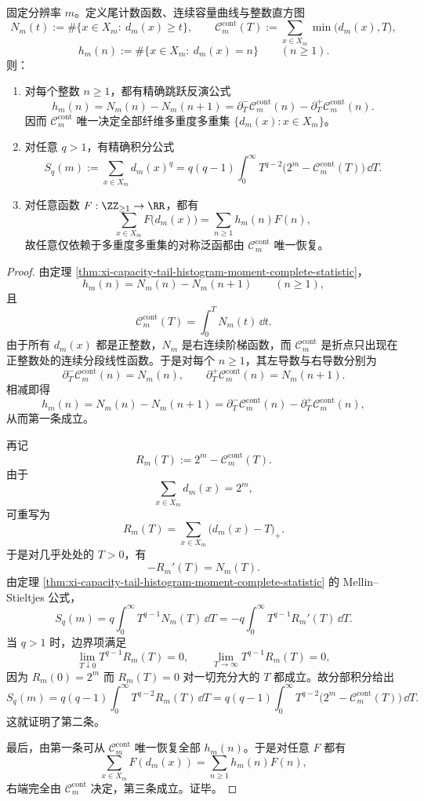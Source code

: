\begin{theorem}[连续容量曲线对纤维多重度谱的完全可逆性]\label{thm:xi-time-part62df-capacity-curve-complete-inversion}
固定分辨率 \(m\)。定义尾计数函数、连续容量曲线与整数直方图
\[
N_m(t):=\#\{x\in X_m:\ d_m(x)\ge t\},
\qquad
\mathcal C_m^{\mathrm{cont}}(T):=\sum_{x\in X_m}\min\bigl(d_m(x),T\bigr),
\]
\[
h_m(n):=\#\{x\in X_m:\ d_m(x)=n\}
\qquad (n\ge 1).
\]
则：
\begin{enumerate}
  \item 对每个整数 \(n\ge 1\)，都有精确跳跃反演公式
  \[
  h_m(n)=N_m(n)-N_m(n+1)
  =\partial_T^{-}\mathcal C_m^{\mathrm{cont}}(n)-\partial_T^{+}\mathcal C_m^{\mathrm{cont}}(n).
  \]
  因而 \(\mathcal C_m^{\mathrm{cont}}\) 唯一决定全部纤维多重度多重集 \(\{d_m(x):x\in X_m\}\)。
  \item 对任意 \(q>1\)，有精确积分公式
  \[
  S_q(m):=\sum_{x\in X_m}d_m(x)^q
  =
  q(q-1)\int_0^\infty
  T^{q-2}\bigl(2^m-\mathcal C_m^{\mathrm{cont}}(T)\bigr)\,\dd T.
  \]
  \item 对任意函数 \(F:\ZZ_{\ge 1}\to \RR\)，都有
  \[
  \sum_{x\in X_m}F\bigl(d_m(x)\bigr)
  =
  \sum_{n\ge 1}h_m(n)F(n),
  \]
  故任意仅依赖于多重度多重集的对称泛函都由 \(\mathcal C_m^{\mathrm{cont}}\) 唯一恢复。
\end{enumerate}
\end{theorem}
\begin{proof}
由定理 \ref{thm:xi-capacity-tail-histogram-moment-complete-statistic}，
\[
h_m(n)=N_m(n)-N_m(n+1)
\qquad(n\ge 1),
\]
且
\[
\mathcal C_m^{\mathrm{cont}}(T)=\int_0^T N_m(t)\,\dd t.
\]
由于所有 \(d_m(x)\) 都是正整数，\(N_m\) 是右连续阶梯函数，而 \(\mathcal C_m^{\mathrm{cont}}\) 是折点只出现在正整数处的连续分段线性函数。于是对每个 \(n\ge 1\)，其左导数与右导数分别为
\[
\partial_T^{-}\mathcal C_m^{\mathrm{cont}}(n)=N_m(n),
\qquad
\partial_T^{+}\mathcal C_m^{\mathrm{cont}}(n)=N_m(n+1).
\]
相减即得
\[
h_m(n)
=
N_m(n)-N_m(n+1)
=
\partial_T^{-}\mathcal C_m^{\mathrm{cont}}(n)-\partial_T^{+}\mathcal C_m^{\mathrm{cont}}(n),
\]
从而第一条成立。

再记
\[
R_m(T):=2^m-\mathcal C_m^{\mathrm{cont}}(T).
\]
由于
\[
\sum_{x\in X_m}d_m(x)=2^m,
\]
可重写为
\[
R_m(T)=\sum_{x\in X_m}\bigl(d_m(x)-T\bigr)_+.
\]
于是对几乎处处的 \(T>0\)，有
\[
-R_m'(T)=N_m(T).
\]
由定理 \ref{thm:xi-capacity-tail-histogram-moment-complete-statistic} 的 Mellin--Stieltjes 公式，
\[
S_q(m)=q\int_0^\infty T^{q-1}N_m(T)\,\dd T
=
-q\int_0^\infty T^{q-1}R_m'(T)\,\dd T.
\]
当 \(q>1\) 时，边界项满足
\[
\lim_{T\downarrow 0}T^{q-1}R_m(T)=0,
\qquad
\lim_{T\to\infty}T^{q-1}R_m(T)=0,
\]
因为 \(R_m(0)=2^m\) 而 \(R_m(T)=0\) 对一切充分大的 \(T\) 都成立。故分部积分给出
\[
S_q(m)=q(q-1)\int_0^\infty T^{q-2}R_m(T)\,\dd T
=
q(q-1)\int_0^\infty T^{q-2}\bigl(2^m-\mathcal C_m^{\mathrm{cont}}(T)\bigr)\,\dd T.
\]
这就证明了第二条。

最后，由第一条可从 \(\mathcal C_m^{\mathrm{cont}}\) 唯一恢复全部 \(h_m(n)\)。于是对任意 \(F\) 都有
\[
\sum_{x\in X_m}F(d_m(x))
=
\sum_{n\ge 1}h_m(n)F(n),
\]
右端完全由 \(\mathcal C_m^{\mathrm{cont}}\) 决定，第三条成立。证毕。
\end{proof}

